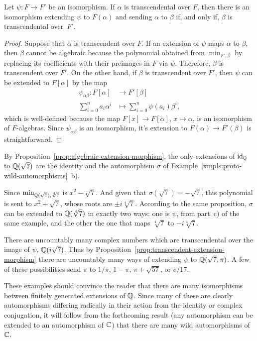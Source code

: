 \begin{prop}\label{prop:transcendent-extension-morphism}
    Let\/ $\psi\colon F\to F'$ be an isomorphism. If\/ $\alpha$ is transcendental over\/ $F$, then there is an isomorphism extending\/ $\psi$ to\/ $F(\alpha)$ and sending\/ $\alpha$ to\/ $\beta$ if, and only if, $\beta$ is transcendental over\/~$F'$.
\end{prop}

\begin{proof}
    Suppose that $\alpha$ is transcendent over $F$. If an extension of $\psi$ maps $\alpha$ to $\beta$, then $\beta$ cannot be algebraic because the polynomial obtained from $\min_{F',\beta}$ by replacing its coefficients with their preimages in $F$ via $\psi$. Therefore, $\beta$ is transcendent over $F'$. On the other hand, if $\beta$ is transcendent over $F'$, then $\psi$ can be extended to $F[\alpha]$ by the map
    \begin{align*}
        \psi_{\alpha\beta}\colon F[\alpha]&\to F'[\beta]\\
        \sum_{i=0}^na_i\alpha^i&\mapsto\sum_{i=0}^n\psi(a_i)\beta^i,
    \end{align*}
    which is well-defined because the map $F[x]\to F[\alpha]$, $x\mapsto\alpha$, is an isomorphism of $F$-algebras. Since $\psi_{\alpha\beta}$ is an isomorphism, it's extension to $F(\alpha)\to F'(\beta)$ is straightforward.
\end{proof}

\begin{xmpls}
    By Proposition~\ref{prop:algebraic-extension-morphism}, the only extensions of $\operatorname{id}_{\mathbb{Q}}$ to $\mathbb{Q}(\sqrt7)$ are the identity and the automorphism $\sigma$ of Example~\ref{xmpls:proto-wild-automorphisms}~b).
    
    Since $\min_{\mathbb{Q}(\sqrt7),\sqrt[4]7}$ is $x^2-\sqrt7$. And given that $\sigma(\sqrt7)=-\sqrt7$, this polynomial is sent to $x^2+\sqrt7$, whose roots are $\pm i\sqrt[4]7$. According to the same proposition, $\sigma$ can be extended to $\mathbb{Q}(\sqrt[4]7)$ in exactly two ways: one is $\psi$, from part~c) of the same example, and the other the one that maps $\sqrt[4]7$ to $-i\sqrt[4]7$.
\end{xmpls}

\begin{rem}
    There are uncountably many complex numbers which are transcendental over the image of $\psi$, $\mathbb{Q}(i\sqrt{7})$. Thus by Proposition~\ref{prop:transcendent-extension-morphism} there are uncountably many ways of extending $\psi$ to $\mathbb{Q}(\sqrt7,\pi)$. A few of these possibilities send $\pi$ to $1/\pi$, $1-\pi$, $\pi+\sqrt{57}$, or $e/17$.
    

    These examples should convince the reader that there are many isomorphisms between finitely generated extensions of $\mathbb{Q}$. Since many of these are clearly automorphisms differing radically in their action from the identity or complex conjugation, it will follow from the forthcoming result (any automorphism can be extended to an automorphism of $\mathbb{C}$) that there are many wild automorphisms of~$\mathbb{C}$.
\end{rem}

